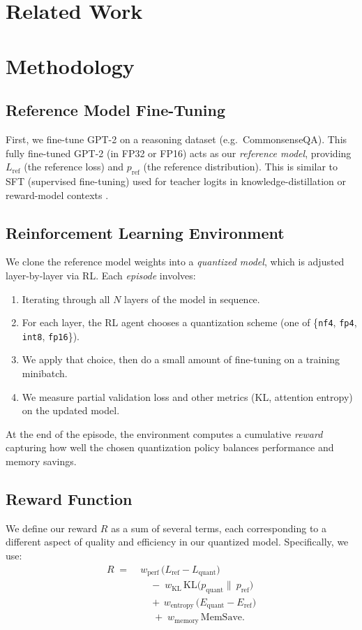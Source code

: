 \documentclass{article}
\begin{document}
\section{Related Work}

\section{Methodology}

\subsection{Reference Model Fine-Tuning}
First, we fine-tune GPT-2 on a reasoning dataset (e.g.\ CommonsenseQA). This fully fine-tuned GPT-2 (in FP32 or FP16) acts as our \emph{reference model}, providing $L_{\mathrm{ref}}$ (the reference loss) and $p_{\mathrm{ref}}$ (the reference distribution). This is similar to SFT (supervised fine-tuning) used for teacher logits in knowledge-distillation or reward-model contexts \cite{Sun2023qlora}.

\subsection{Reinforcement Learning Environment}
We clone the reference model weights into a \emph{quantized model}, which is adjusted layer-by-layer via RL. Each \emph{episode} involves:
\begin{enumerate}
	\item Iterating through all $N$ layers of the model in sequence.
	\item For each layer, the RL agent chooses a quantization scheme (one of \{\texttt{nf4}, \texttt{fp4}, \texttt{int8}, \texttt{fp16}\}).
	\item We apply that choice, then do a small amount of fine-tuning on a training minibatch.
	\item We measure partial validation loss and other metrics (KL, attention entropy) on the updated model.
\end{enumerate}
At the end of the episode, the environment computes a cumulative \emph{reward} capturing how well the chosen quantization policy balances performance and memory savings.

\subsection{Reward Function}
\label{sec:reward}
We define our reward $R$ as a sum of several terms, each corresponding to a different aspect of quality and efficiency in our quantized model. Specifically, we use:
\begin{align}
	R \;=\;& w_{\mathrm{perf}}\,\bigl(L_{\mathrm{ref}} - L_{\mathrm{quant}}\bigr)\; 
	\nonumber \\
	&\quad -\;w_{\mathrm{KL}}\,\mathrm{KL}\bigl(p_{\mathrm{quant}}\|\ p_{\mathrm{ref}}\bigr)
	\nonumber \\
	&\quad +\, w_{\mathrm{entropy}}\,\bigl(E_{\mathrm{quant}} - E_{\mathrm{ref}}\bigr)
	\nonumber \\
	&\quad \;+\; w_{\mathrm{memory}}\,\mathrm{MemSave}.
	\label{eq:reward}
\end{align}
\end{document}
